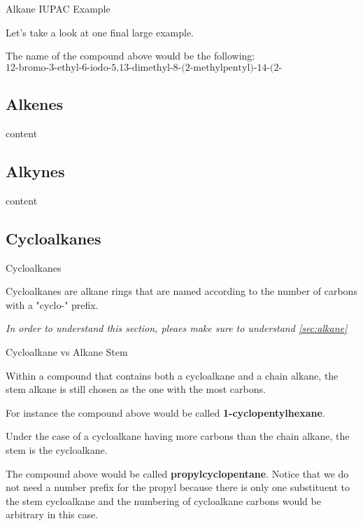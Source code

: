 \documentclass[10pt]{article}
\begin{document}
    \begin{core}{Alkane IUPAC Example}

      Let's take a look at one final large example.


      The name of the compound above would be the following:
      \[
        \text{12-bromo-3-ethyl-6-iodo-5,13-dimethyl-8-(2-methylpentyl)-14-(2-methylpropyl)octadecane}
      \]

    \end{core}

  \subsection{Alkenes}

    content

  \subsection{Alkynes}

    content

  \subsection{Cycloalkanes}

    \begin{core}{Cycloalkanes}

      Cycloalkanes are alkane rings that are named according to the number of carbons with a "cyclo-" prefix.


      \textit{In order to understand this section, pleaes make sure to understand \autoref{sec:alkane}}

    \end{core}

    \begin{core}{Cycloalkane vs Alkane Stem}

      Within a compound that contains both a cycloalkane and a chain alkane, the stem alkane is still chosen as the one with the most carbons. 


      For instance the compound above would be called \textbf{1-cyclopentylhexane}.

      Under the case of a cycloalkane having more carbons than the chain alkane, the stem is the cycloalkane.


      The compound above would be called \textbf{propylcyclopentane}. Notice that we do not need a number prefix for the propyl because there is only one substituent to the stem cycloalkane and the numbering of cycloalkane carbons would be arbitrary in this case.

    \end{core}
\end{document}
